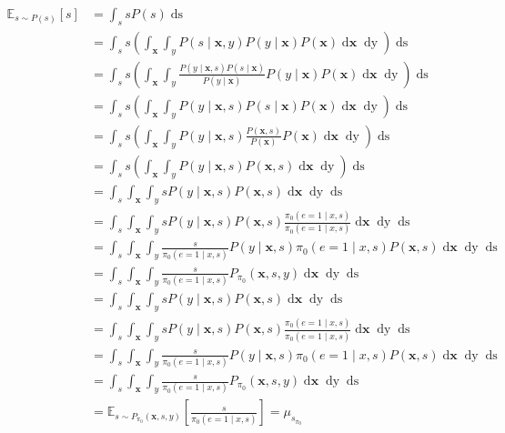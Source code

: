 \documentclass[
	a4paper,
	11pt
	]{article}
\begin{document}
\begin{align*}
    \mathbb{E}_{s \sim P(s)}[s] &= \int_s sP(s) \mathop{ds} \\
    &= \int_s s \left(\int_{\boldsymbol{x}} \int_{y} P(s \mid \boldsymbol{x}, y)P(y \mid \boldsymbol{x})P(\boldsymbol{x}) \mathop{d\boldsymbol{x}} \mathop{dy}\right) \mathop{ds} \\
    &= \int_s s \left(\int_{\boldsymbol{x}} \int_{y} \frac{P(y \mid \boldsymbol{x}, s)P(s \mid \boldsymbol{x})}{P(y \mid \boldsymbol{x})} P(y \mid \boldsymbol{x})P(\boldsymbol{x}) \mathop{d\boldsymbol{x}} \mathop{dy}\right) \mathop{ds} \\
    &= \int_s s \left(\int_{\boldsymbol{x}} \int_{y} P(y \mid \boldsymbol{x}, s)P(s \mid \boldsymbol{x})P(\boldsymbol{x}) \mathop{d\boldsymbol{x}} \mathop{dy}\right) \mathop{ds} \\
    &= \int_s s \left(\int_{\boldsymbol{x}} \int_{y} P(y \mid \boldsymbol{x}, s)\frac{P(\boldsymbol{x}, s)}{P(\boldsymbol{x})} P(\boldsymbol{x}) \mathop{d\boldsymbol{x}} \mathop{dy}\right) \mathop{ds} \\
    &= \int_s s \left(\int_{\boldsymbol{x}} \int_{y} P(y \mid \boldsymbol{x}, s)P(\boldsymbol{x}, s)\mathop{d\boldsymbol{x}} \mathop{dy}\right) \mathop{ds} \\
    &= \int_s \int_{\boldsymbol{x}} \int_{y} s P(y \mid \boldsymbol{x}, s)P(\boldsymbol{x}, s)\mathop{d\boldsymbol{x}} \mathop{dy} \mathop{ds} \\
    &= \int_s \int_{\boldsymbol{x}} \int_{y} s P(y \mid \boldsymbol{x}, s)P(\boldsymbol{x}, s)\frac{\pi_0(e = 1 \mid x,s)}{\pi_0(e = 1 \mid x,s)}\mathop{d\boldsymbol{x}} \mathop{dy} \mathop{ds} \\
    &= \int_s \int_{\boldsymbol{x}} \int_{y} \frac{s}{\pi_0(e = 1 \mid x,s)} P(y \mid \boldsymbol{x}, s)\pi_0(e = 1 \mid x,s)P(\boldsymbol{x}, s)\mathop{d\boldsymbol{x}} \mathop{dy} \mathop{ds} \\
    &= \int_s \int_{\boldsymbol{x}} \int_{y} \frac{s}{\pi_0(e = 1 \mid x,s)} P_{\pi_0}(\boldsymbol{x}, s, y)\mathop{d\boldsymbol{x}} \mathop{dy} \mathop{ds} \\
    &= \int_s \int_{\boldsymbol{x}} \int_{y} s P(y \mid \boldsymbol{x}, s)P(\boldsymbol{x}, s) \mathop{d\boldsymbol{x}} \mathop{dy} \mathop{ds} \\
    &= \int_s \int_{\boldsymbol{x}} \int_{y} s P(y \mid \boldsymbol{x}, s)P(\boldsymbol{x}, s)\frac{\pi_0(e = 1 \mid x,s)}{\pi_0(e = 1 \mid x,s)} \mathop{d\boldsymbol{x}} \mathop{dy} \mathop{ds} \\
    &= \int_s \int_{\boldsymbol{x}} \int_{y} \frac{s}{\pi_0(e = 1 \mid x,s)} P(y \mid \boldsymbol{x}, s)\pi_0(e = 1 \mid x,s)P(\boldsymbol{x}, s) \mathop{d\boldsymbol{x}} \mathop{dy} \mathop{ds} \\
    &= \int_s \int_{\boldsymbol{x}} \int_{y} \frac{s}{\pi_0(e = 1 \mid x,s)} P_{\pi_{0}}(\boldsymbol{x}, s, y) \mathop{d\boldsymbol{x}} \mathop{dy} \mathop{ds} \\
    &= \mathbb{E}_{s \sim P_{\pi_{0}}(\boldsymbol{x}, s, y)}\left[\frac{s}{\pi_0(e = 1 \mid x,s)}\right] = \mu_{s_{\pi_0}}
\end{align*}
\end{document}
